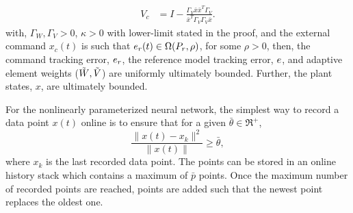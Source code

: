 \begin{theorem}
\begin{align}
    V_c &=I-\frac{\Gamma_V\bar{x}\bar{x}^T\Gamma_V}{\bar{x}^T\Gamma_V\Gamma_V\bar{x}}.
\end{align}
with, $\Gamma_W, \Gamma_V > 0$, $\kappa > 0$ with lower-limit stated
in the proof, and the external command $x_c(t)$ is such that $e_r(t)
\in \Omega(P_r,\rho)$, for some $\rho
> 0$, then, the command tracking error, $e_r$, the reference model
tracking error, $e$, and adaptive element weights ($\tilde{W},\tilde{V}$) are uniformly
ultimately bounded. Further, the plant states, $x$, are ultimately
bounded.
\end{theorem}



For the nonlinearly parameterized neural network, the simplest way to record a data point $x(t)$ online is to ensure that for a given $\bar\theta\in\Re^+$,
\begin{equation}
\label{eq:points_criterion}
\frac{\|x(t)-x_k\|^2}{\|x(t)\|} \geq \bar\theta,
\end{equation}
where $x_k$ is the last recorded data point. The points can be stored in an online history stack which contains a maximum of $\bar p$ points. Once the maximum number of recorded points are reached, points are added such that the newest point replaces the oldest one.


